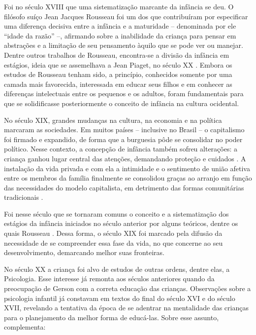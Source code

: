 Foi no século XVIII que uma sistematização marcante da infância se deu. O filósofo suíço Jean Jacques Rousseau foi um dos que contribuíram por especificar uma diferença decisiva entre a infância e a maturidade -- denominada por ele ``idade da razão'' --, afirmando sobre a inabilidade da criança para pensar em abstrações e a limitação de seu pensamento àquilo que se pode ver ou manejar. Dentre outros trabalhos de Rousseau, encontra-se a divisão da infância em estágios, ideia que se assemelhava a Jean Piaget\footnotemark, no século XX \cite[p. 9]{GALLATIN1978}. Embora os estudos de Rousseau tenham sido, a princípio, conhecidos somente por uma camada mais favorecida, interessada em educar seus filhos e em conhecer as diferenças intelectuais entre os pequenos e os adultos, foram fundamentais para que se solidificasse posteriormente o conceito de infância na cultura ocidental.  


No século XIX, grandes mudanças na cultura, na economia e na política marcaram as sociedades. Em muitos países -- inclusive no Brasil -- o capitalismo foi firmado e expandido, de forma que a burguesia pôde se consolidar no poder político. Nesse contexto, a concepção de infância também sofreu alterações: a criança ganhou lugar central das atenções, demandando proteção e cuidados . A instalação da vida privada e com ela a intimidade e o sentimento de união afetiva entre os membros da família finalmente se consolidou graças ao arranjo em função das necessidades do modelo capitalista, em detrimento das formas comunitárias tradicionais \cite{MIRANDA1989}.

Foi nesse século que se tornaram comuns o conceito e a sistematização dos estágios da infância iniciados no século anterior por alguns teóricos, dentre os quais Rousseau \cite{GALLATIN1978}. Dessa forma, o século XIX foi marcado pela difusão da necessidade de se compreender essa fase da vida, no que concerne ao seu desenvolvimento, demarcando melhor suas fronteiras. 

No século XX a criança foi alvo de estudos de outras ordens, dentre elas, a Psicologia. Esse interesse já remonta aos séculos anteriores quando da preocupação de Gerson com a correta educação das crianças. Observações sobre a psicologia infantil já constavam em textos do final do século XVI e do século XVII, revelando a tentativa da época de se adentrar na mentalidade das crianças para o planejamento da melhor forma de educá-las. Sobre esse assunto,  complementa:

